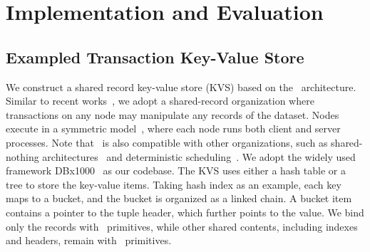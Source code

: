 \section{Implementation and Evaluation}    \label{sec:eval}

\subsection{Exampled Transaction Key-Value Store} \label{subsec:implementation}

We construct a shared record key-value store (KVS) based on the \name~architecture. Similar to recent works~\cite{mtcp_nsdi14, xenic_sosp21, ipipe_sigcomm19, linefs_sosp21, fasst, drtmh, grappa_atc15, drtm}, we adopt a shared-record organization where transactions on any node may manipulate any records of the dataset. 
Nodes execute in a symmetric model~\cite{fasst, drtmh, drtm, farm_nsdi14}, where each node runs both client and server processes. 
Note that \name~is also compatible with other organizations, such as shared-nothing architectures~\cite{hstore_damon16, citus_sigmod21, memsql_vldb16, voltdb, calvin_sigmod12} and deterministic scheduling~\cite{caracal_sosp21, calvin_sigmod12}.
We adopt the widely used framework DBx1000~\cite{abyss_vldb14, taurus_vldb2020} as our codebase. The KVS uses either a hash table or a tree to store the key-value items. 
Taking hash index as an example, each key maps to a bucket, and the bucket is organized as a linked chain. 
A bucket item contains a pointer to the tuple header, which further points to the value. 
We bind only the records with \name~primitives, while other shared contents, including indexes and headers, remain with \vanilla~primitives.


